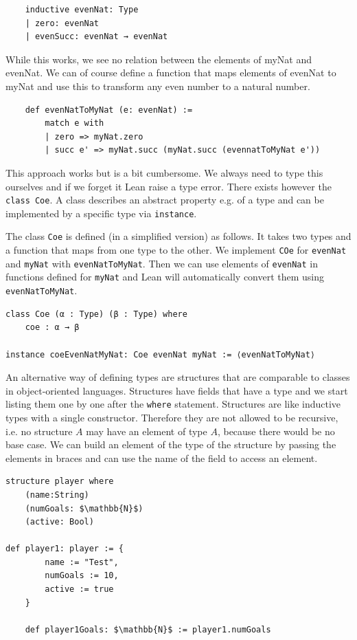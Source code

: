 \begin{lstlisting}
    inductive evenNat: Type
    | zero: evenNat
    | evenSucc: evenNat → evenNat
\end{lstlisting}

While this works, we see no relation between the elements of myNat and evenNat. We can of course define a function that maps elements of evenNat to myNat and use this to transform any even number to a natural number.

\begin{lstlisting}
    def evenNatToMyNat (e: evenNat) := 
        match e with
        | zero => myNat.zero
        | succ e' => myNat.succ (myNat.succ (evennatToMyNat e'))
\end{lstlisting}

This approach works but is a bit cumbersome. We always need to type this ourselves and if we forget it Lean raise a type error. There exists however the \lstinline|class Coe|. A class describes an abstract property e.g. of a type and can be implemented by a specific type via \lstinline|instance|.

The class \lstinline|Coe| is defined (in a simplified version) as follows. It takes two types and a function that maps from one type to the other. We implement \lstinline|COe| for \lstinline|evenNat| and \lstinline|myNat| with \lstinline|evenNatToMyNat|. Then we can use elements of \lstinline|evenNat| in functions defined for \lstinline|myNat| and Lean will automatically convert them using \lstinline|evenNatToMyNat|.

\begin{lstlisting}
class Coe (α : Type) (β : Type) where
    coe : α → β

instance coeEvenNatMyNat: Coe evenNat myNat := ⟨evenNatToMyNat⟩
\end{lstlisting}

An alternative way of defining types are structures that are comparable to classes in object-oriented languages. Structures have fields that have a type and we start listing them one by one after the \lstinline|where| statement. Structures are like inductive types with a single constructor. Therefore they are not allowed to be recursive, i.e. no structure $A$ may have an element of type $A$, because there would be no base case.
We can build an element of the type of the structure by passing the elements in braces and can use the name of the field to access an element.

\begin{lstlisting}
structure player where
    (name:String)
    (numGoals: $\mathbb{N}$)
    (active: Bool)

def player1: player := {
        name := "Test",
        numGoals := 10,
        active := true
    }

    def player1Goals: $\mathbb{N}$ := player1.numGoals
\end{lstlisting}


